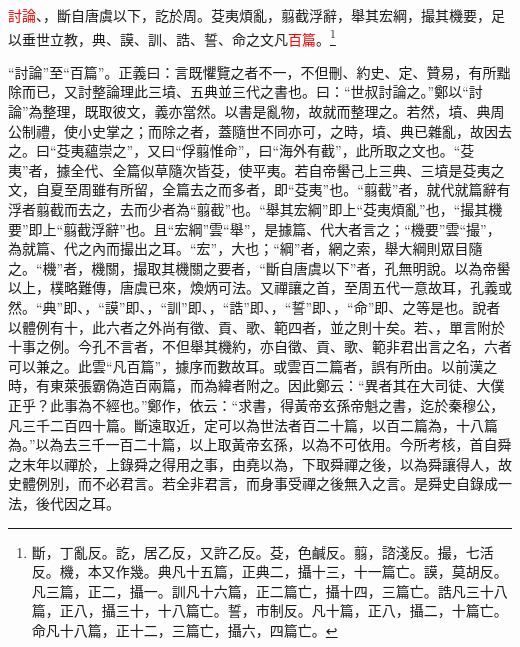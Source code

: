 \textcolor{red}{討論}、，斷自唐虞以下，訖於周。芟夷煩亂，翦截浮辭，舉其宏綱，撮其機要，足以垂世立教，典、謨、訓、誥、誓、命之文凡\textcolor{red}{百篇}。\footnote{斷，丁亂反。訖，居乙反，又許乙反。芟，色鹹反。翦，諮淺反。撮，七活反。機，本又作幾。典凡十五篇，正典二，攝十三，十一篇亡。謨，莫胡反。凡三篇，正二，攝一。訓凡十六篇，正二篇亡，攝十四，三篇亡。誥凡三十八篇，正八，攝三十，十八篇亡。誓，市制反。凡十篇，正八，攝二，十篇亡。命凡十八篇，正十二，三篇亡，攝六，四篇亡。}

{\noindent\shu{}\fzkt “討論”至“百篇”。正義曰：言既懼覽之者不一，不但刪、約史、定、贊易，有所黜除而已，又討整論理此三墳、五典並三代之書也。曰：“世叔討論之。”鄭以“討論”為整理，既取彼文，義亦當然。以書是亂物，故就而整理之。若然，墳、典周公制禮，使小史掌之；而除之者，蓋隨世不同亦可，之時，墳、典已雜亂，故因去之。曰“芟夷蘊崇之”，又曰“俘翦惟命”，曰“海外有截”，此所取之文也。“芟夷”者，據全代、全篇似草隨次皆芟，使平夷。若自帝嚳己上三典、三墳是芟夷之文，自夏至周雖有所留，全篇去之而多者，即“芟夷”也。“翦截”者，就代就篇辭有浮者翦截而去之，去而少者為“翦截”也。“舉其宏綱”即上“芟夷煩亂”也，“撮其機要”即上“翦截浮辭”也。且“宏綱”雲“舉”，是據篇、代大者言之；“機要”雲“撮”，為就篇、代之內而撮出之耳。“宏”，大也；“綱”者，網之索，舉大綱則眾目隨之。“機”者，機關，撮取其機關之要者，“斷自唐虞以下”者，孔無明說。以為帝嚳以上，樸略難傳，唐虞已來，煥炳可法。又禪讓之首，至周五代一意故耳，孔義或然。“典”即、，“謨”即、，“訓”即、，“誥”即、，“誓”即、，“命”即、之等是也。說者以體例有十，此六者之外尚有徵、貢、歌、範四者，並之則十矣。若、，單言附於十事之例。今孔不言者，不但舉其機約，亦自徵、貢、歌、範非君出言之名，六者可以兼之。此雲“凡百篇”，據序而數故耳。或雲百二篇者，誤有所由。以前漢之時，有東萊張霸偽造百兩篇，而為緯者附之。因此鄭云：“異者其在大司徒、大僕正乎？此事為不經也。”鄭作，依云：“求書，得黃帝玄孫帝魁之書，迄於秦穆公，凡三千二百四十篇。斷遠取近，定可以為世法者百二十篇，以百二篇為，十八篇為。”以為去三千一百二十篇，以上取黃帝玄孫，以為不可依用。今所考核，首自舜之末年以禪於，上錄舜之得用之事，由堯以為，下取舜禪之後，以為舜讓得人，故史體例別，而不必君言。若全非君言，而身事受禪之後無入之言。是舜史自錄成一法，後代因之耳。 \par}

